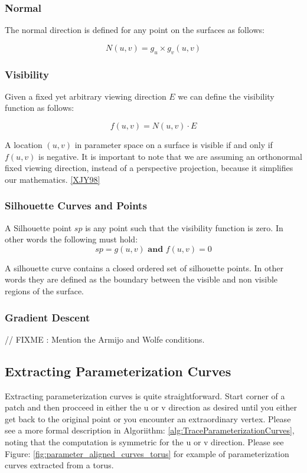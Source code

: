 \documentclass[12pt, letterpaper]{article}
\begin{document}
		\subsubsection{Normal}

		The normal direction is defined for any point on the surfaces as follows:

		$$N(u,v) = g_{u} \times g_{v} (u, v)$$

		\subsubsection{Visibility}

		Given a fixed yet arbitrary viewing direction $E$ we can define the visibility function as follows:

		$$f(u, v) = N(u, v) \cdot E$$

		A location $(u, v)$ in parameter space on a surface is visible if and only if $f(u, v)$ is negative.
		It is important to note that we are assuming an orthonormal fixed viewing direction, instead of a perspective projection,
		because it simplifies our mathematics. \ref{XJY98}

		\subsubsection{Silhouette Curves and Points}

		A Silhouette point $sp$ is any point such that the visibility function is zero. In other words the following must hold:
		$$sp = g(u, v) \textbf{ and } f(u, v) = 0$$

		A silhouette curve contains a closed ordered set of silhouette points. In other words they are defined as the boundary between the visible and non visible regions of the surface.

		\subsubsection{Gradient Descent}

		// FIXME : Mention the Armijo and Wolfe conditions.

	\subsection{Extracting Parameterization Curves}

		Extracting parameterization curves is quite straightforward. Start corner of a patch and then procceed in either the u or v direction as desired until you either get back to the original point or you encounter an extraordinary vertex.
		Please see a more formal description in Algoriithm: \ref{alg:TraceParameterizationCurves}, noting that the computation is symmetric for the u or v direction.
		Please see Figure: \ref{fig:parameter_aligned_curves_torus} for example of parameterization curves extracted from a torus.
\end{document}
